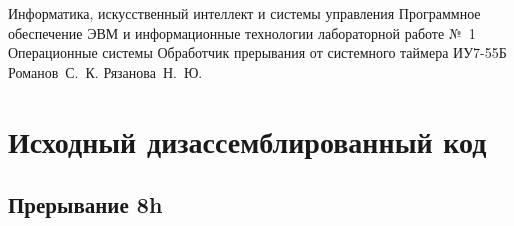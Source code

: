 \documentclass[a4paper,12pt]{bmstu}
\begin{document}
\makereporttitle
    {Информатика, искусственный интеллект и системы управления} %
    {Программное обеспечение ЭВМ и информационные технологии} %
    {лабораторной работе №~1} %
    {Операционные системы} %
    {Обработчик прерывания от системного таймера} %
    {} %
    {ИУ7-55Б} %
    {Романов~С.~К.} %
    {Рязанова~Н.~Ю.} %
\clearpage

\chapter{Исходный дизассемблированный код}\label{ch:source}
\section{Прерывание 8h}\label{sec:Dis_int}
\end{document}
